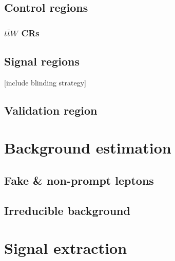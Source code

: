 \documentclass[../thesis.tex]{subfiles}
\begin{document}
\subsection{Control regions}
\subsubsection*{$t\bar{t}W$ CRs}
\subsection{Signal regions}
[include blinding strategy]
\subsection{Validation region}


\section{Background estimation}
\label{sec:bg}
\subsection{Fake \& non-prompt leptons}
\subsection{Irreducible background}


\section{Signal extraction}
\label{sec:mva}
\end{document}
